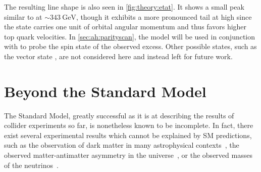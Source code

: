 The resulting \mWWbb line shape is also seen in \cref{fig:theory:etat}. It shows a small peak similar to \etat at $\sim \SI{343}{\GeV}$, though it exhibits a more pronounced tail at high \mWWbb since the  state carries one unit of orbital angular momentum and thus favors higher top quark velocities. In \cref{sec:ah:parityscan}, the \chit model will be used in conjunction with \etat to probe the spin state of the observed excess. Other possible states, such as the vector state , are not considered here and instead left for future work.








\section{Beyond the Standard Model}
\label{sec:theory:bsm}

The Standard Model, greatly successful as it is at describing the results of collider experiments so far, is nonetheless known to be incomplete. In fact, there exist several experimental results which cannot be explained by SM predictions, such as the observation of dark matter in many astrophysical contexts~\cite{Bertone:2004pz,Porter:2011nv,Arbey:2021gdg}, the observed matter-antimatter asymmetry in the universe~\cite{Dine:2003ax,Canetti:2012zc}, or the observed masses of the neutrinos~\cite{deGouvea:2016qpx,Dev:2023iyn}. 

